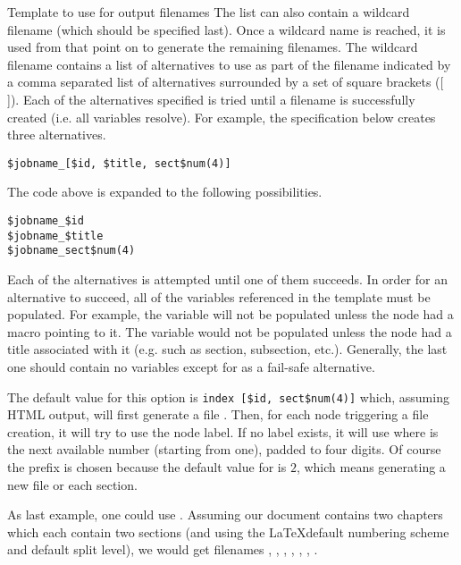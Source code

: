 \begin{configuration}{Template to use for output filenames}
The list can also contain a wildcard filename (which should be
specified last).  Once a wildcard name is reached, it is
used from that point on to generate the remaining filenames.
The wildcard filename contains a list of alternatives to use as
part of the filename indicated by a comma separated list of
alternatives surrounded by a set of square brackets ([ ]).
Each of the alternatives specified is tried until a filename is
successfully created (i.e. all variables resolve).  For example,
the specification below creates three alternatives.

\begin{verbatim}
$jobname_[$id, $title, sect$num(4)]
\end{verbatim}

The code above is expanded to the following possibilities.

\begin{verbatim}
$jobname_$id
$jobname_$title
$jobname_sect$num(4)
\end{verbatim}

Each of the alternatives is attempted until one of them succeeds.
In order for an alternative to succeed, all of the variables referenced
in the template must be populated.  For example, the  variable
will not be populated unless the node had a  macro
pointing to it.  The  variable would not be populated unless
the node had a title associated with it (e.g. such as section, subsection, etc.).
Generally, the last one should contain no variables except for
 as a fail-safe alternative.

The default value for this option is \verb+index [$id, sect$num(4)]+
which, assuming HTML output, will first generate a file
. Then, for each node triggering a file creation, it
will try to use the node label. If no label exists, it will use
 where  is the next available number (starting
from one), padded to four digits. Of course the prefix  is
chosen because the default value for  is $2$, which
means generating a new file or each section.

As last example, one could use .
Assuming our document contains two chapters which each contain two
sections (and using the \LaTeX default numbering scheme and default
\plasTeX split level), we would get filenames
, , ,
, , ,
.

\end{configuration}

